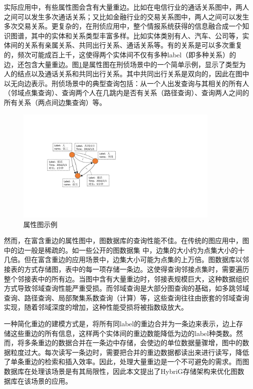 实际应用中，有些属性图会含有大量重边。比如在电信行业的通话关系图中，两人之间可以发生多次通话关系；又比如金融行业的交易关系图中，两人之间可以发生多次交易关系。更复杂的，在刑侦应用中，整个情报系统获得的信息融合成一个知识图谱\supercite{knowledge_graph}，其中的实体和关系类型丰富多样。比如实体类别有人、汽车、公司等，实体间的关系有亲属关系、共同出行关系、通话关系等。有的关系是可以多次重复的，频次可能成百上千，这使得两个实体间不仅有多种label（即多种关系）的边，还包含大量重边。图\ref{fig:property_graph}是属性图在刑侦场景中的一个简单示例，显示了类型为人的结点以及通话关系和共同出行关系。其中共同出行关系是双向的，因此在图中以无向边表示。刑侦场景中的典型查询包括：从一个人出发查询与其相关的所有人（邻域点集查询）、查询两个人在几跳内是否有关系（路径查询）、查询两人之间的所有关系（两点间边集查询）等。

\begin{figure}[htbp]
\centering
\includegraphics[width=100mm]{fig/property_graph.pdf}
\caption{属性图示例}
\label{fig:property_graph}
\end{figure}



然而，在富含重边的属性图中，图数据库的查询性能不佳。在传统的图应用中，图中的边一般是稀疏的。如一些公开的图数据集 中，边集的大小约为点集大小的十几倍。但在富含重边的应用场景中，边集大小可能为点集的上万倍。图数据库以邻接表的方式存储图，表中的每一项存储一条边。这使得查询邻接点集时，需要遍历整个邻接表中的所有边。当图中含有大量重边时，邻接表规模巨大，这种数据组织方式导致邻域查询性能严重受损。而邻域查询是大部分图查询的基础，如多跳邻域查询、路径查询、局部聚集系数查询（计算）等，这些查询往往由嵌套的邻域查询实现，随着邻域深度的增加，这种性能受损将被指数级放大。

一种简化重边的建模方式是，将所有同label的重边合并为一条边来表示，边上存储这些重边的所有信息，这样两个实体间的重边数能降低为边的label种类数。然而，将多条重边的数据合并在一条边中存储，会使边的单位数据量骤增，图中的数据粒度过大。每次读写一条边时，需要把合并的重边数据都读出来进行读写，降低了单条重边的检索和插入效率。因此，处理大量重边是一个不可避免的需求。而图数据库在处理该场景是有其局限性，因此本文提出了HybriG存储架构来优化图数据库在该场景的应用。

